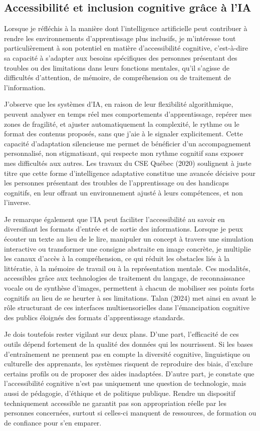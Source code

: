 \documentclass[11pt,a4paper]{report}
\begin{document}
\subsection{Accessibilité et inclusion cognitive grâce à l’IA}

Lorsque je réfléchis à la manière dont l’intelligence artificielle peut contribuer à rendre les environnements d’apprentissage plus inclusifs, je m’intéresse tout particulièrement à son potentiel en matière d’accessibilité cognitive, c’est-à-dire sa capacité à s’adapter aux besoins spécifiques des personnes présentant des troubles ou des limitations dans leurs fonctions mentales, qu’il s’agisse de difficultés d’attention, de mémoire, de compréhension ou de traitement de l’information.

J’observe que les systèmes d’IA, en raison de leur flexibilité algorithmique, peuvent analyser en temps réel mes comportements d’apprentissage, repérer mes zones de fragilité, et ajuster automatiquement la complexité, le rythme ou le format des contenus proposés, sans que j’aie à le signaler explicitement. Cette capacité d’adaptation silencieuse me permet de bénéficier d’un accompagnement personnalisé, non stigmatisant, qui respecte mon rythme cognitif sans exposer mes difficultés aux autres. Les travaux du CSE Québec (2020) soulignent à juste titre que cette forme d’intelligence adaptative constitue une avancée décisive pour les personnes présentant des troubles de l’apprentissage ou des handicaps cognitifs, en leur offrant un environnement ajusté à leurs compétences, et non l’inverse.

Je remarque également que l’IA peut faciliter l’accessibilité au savoir en diversifiant les formats d’entrée et de sortie des informations. Lorsque je peux écouter un texte au lieu de le lire, manipuler un concept à travers une simulation interactive ou transformer une consigne abstraite en image concrète, je multiplie les canaux d’accès à la compréhension, ce qui réduit les obstacles liés à la littératie, à la mémoire de travail ou à la représentation mentale. Ces modalités, accessibles grâce aux technologies de traitement du langage, de reconnaissance vocale ou de synthèse d’images, permettent à chacun de mobiliser ses points forts cognitifs au lieu de se heurter à ses limitations. Talan (2024) met ainsi en avant le rôle structurant de ces interfaces multisensorielles dans l’émancipation cognitive des publics éloignés des formats d’apprentissage standards.

Je dois toutefois rester vigilant sur deux plans. D’une part, l’efficacité de ces outils dépend fortement de la qualité des données qui les nourrissent. Si les bases d’entraînement ne prennent pas en compte la diversité cognitive, linguistique ou culturelle des apprenants, les systèmes risquent de reproduire des biais, d’exclure certains profils ou de proposer des aides inadaptées. D’autre part, je constate que l’accessibilité cognitive n’est pas uniquement une question de technologie, mais aussi de pédagogie, d’éthique et de politique publique. Rendre un dispositif techniquement accessible ne garantit pas son appropriation réelle par les personnes concernées, surtout si celles-ci manquent de ressources, de formation ou de confiance pour s’en emparer.
\end{document}
